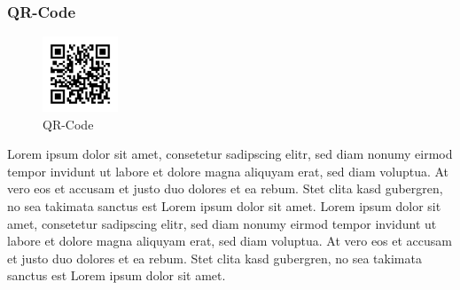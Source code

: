 \subsubsection{QR-Code}
\begin{figure}
	\centering
	\vspace{-0.65cm}
	\includegraphics[width=0.2\textwidth]{Bilder/QR_Code.png}
	\vspace{-0.2cm}
	\caption[]{QR-Code\footnotemark}
	\label{qrcode}
\end{figure}
Lorem ipsum dolor sit amet, consetetur sadipscing elitr, sed diam nonumy eirmod tempor invidunt ut labore et dolore magna aliquyam erat, sed diam voluptua. At vero eos et accusam et justo duo dolores et ea rebum. Stet clita kasd gubergren, no sea takimata sanctus est Lorem ipsum dolor sit amet. Lorem ipsum dolor sit amet, consetetur sadipscing elitr, sed diam nonumy eirmod tempor invidunt ut labore et dolore magna aliquyam erat, sed diam voluptua. At vero eos et accusam et justo duo dolores et ea rebum. Stet clita kasd gubergren, no sea takimata sanctus est Lorem ipsum dolor sit amet.
~\pagebreak
